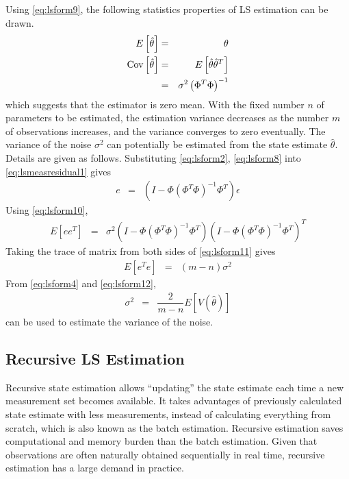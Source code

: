 Using \eqref{eq:lsform9}, the following statistics properties of LS estimation can be drawn.
\begin{eqnarray}
  E\left[\hat{\theta}\right] &=& \theta \nonumber \\
  \textup{Cov}\left[\hat{\theta}\right] &=& E\left[\hat{\theta}\hat{\theta}^T\right] \nonumber \\
  &=& \sigma^2\left(\Phi^T\Phi\right)^{-1} \nonumber
\end{eqnarray}
which suggests that the estimator is zero mean. With the fixed number $n$ of parameters to be estimated, the estimation variance decreases as the number $m$ of observations increases, and the variance converges to zero eventually. The variance of the noise $\sigma^2$ can potentially be estimated from the state estimate $\hat{\theta}$. Details are given as follows. Substituting \eqref{eq:lsform2}, \eqref{eq:lsform8} into \eqref{eq:lsmeasresidual1} gives
\begin{eqnarray}
  e &=& \left(I - \Phi\left(\Phi^T\Phi\right)^{-1}\Phi^T\right)\epsilon \label{eq:lsform10}
\end{eqnarray}
Using \eqref{eq:lsform10},
\begin{eqnarray}
  E\left[ee^T\right] &=& \sigma^2\left(I - \Phi\left(\Phi^T\Phi\right)^{-1}\Phi^T\right)\left(I - \Phi\left(\Phi^T\Phi\right)^{-1}\Phi^T\right)^T \label{eq:lsform11}
\end{eqnarray}
Taking the trace of matrix from both sides of \eqref{eq:lsform11} gives
\begin{eqnarray}
  E\left[e^Te\right] &=& (m-n)\sigma^2 \label{eq:lsform12}
\end{eqnarray}
From \eqref{eq:lsform4} and \eqref{eq:lsform12},
\begin{eqnarray}
  \sigma^2 &=& \dfrac{2}{m-n}E\left[V(\hat{\theta})\right] \nonumber
\end{eqnarray}
can be used to estimate the variance of the noise.

\subsection{Recursive LS Estimation}

Recursive state estimation allows ``updating'' the state estimate each time a new measurement set becomes available. It takes advantages of previously calculated state estimate with less measurements, instead of calculating everything from scratch, which is also known as the batch estimation. Recursive estimation saves computational and memory burden than the batch estimation. Given that observations are often naturally obtained sequentially in real time, recursive estimation has a large demand in practice.

